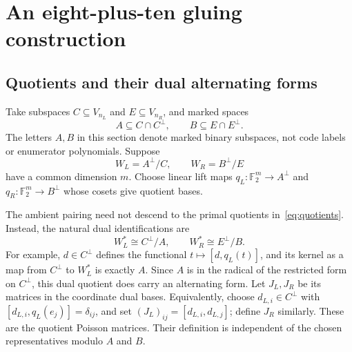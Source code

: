 \documentclass[11pt,a4paper]{article}
\newcommand{\F}{\mathbb F_2}
\begin{document}
\section{An eight-plus-ten gluing construction}\label{sec:gluing}
\subsection{Quotients and their dual alternating forms}
Take subspaces $C\subseteq V_{n_L}$ and $E\subseteq V_{n_R}$, and marked spaces
\[
 A\subseteq C\cap C^\perp,\qquad B\subseteq E\cap E^\perp.
\]
The letters $A,B$ in this section denote marked binary subspaces, not code labels or enumerator polynomials. Suppose
\begin{equation}\label{eq:quotients}
 W_L=A^\perp/C,\qquad W_R=B^\perp/E
\end{equation}
have a common dimension $m$. Choose linear lift maps $q_L:\F^m\to A^\perp$ and $q_R:\F^m\to B^\perp$ whose cosets give quotient bases.

The ambient pairing need not descend to the primal quotients in~\eqref{eq:quotients}. Instead, the natural dual identifications are
\begin{equation}\label{eq:dualquotients}
 W_L^*\cong C^\perp/A,\qquad W_R^*\cong E^\perp/B.
\end{equation}
For example, $d\in C^\perp$ defines the functional $t\mapsto[d,q_L(t)]$, and its kernel as a map from $C^\perp$ to $W_L^*$ is exactly $A$. Since $A$ is in the radical of the restricted form on $C^\perp$, this dual quotient does carry an alternating form. Let $J_L,J_R$ be its matrices in the coordinate dual bases. Equivalently, choose $d_{L,i}\in C^\perp$ with $[d_{L,i},q_L(e_j)]=\delta_{ij}$, and set $(J_L)_{ij}=[d_{L,i},d_{L,j}]$; define $J_R$ similarly. These are the quotient Poisson matrices. Their definition is independent of the chosen representatives modulo $A$ and $B$.
\end{document}
